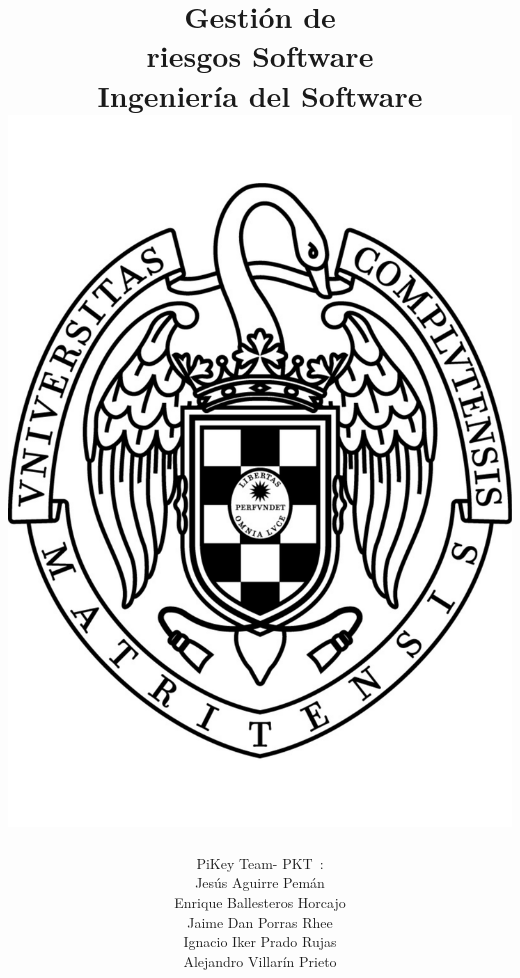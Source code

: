 \documentclass[spanish,a4paper,11pt, twoside]{report}	%
\newcommand*{\PKT}{\hbox{P}\kern-2.5pt\lower3.5pt\hbox{\small{K}}\kern-2.8pt\hbox{T}\kern-2pt}	%
\begin{document}
\title{\textbf{\huge{Gestión de \\ 
	riesgos Software}} \\ \vspace{0.3cm}
	\Large{Ingeniería del Software} \\
	\includegraphics[scale=0.3]{ucm.pdf}}
\author{{\Large{PiKey Team-}} \PKT \ : \vspace{0.2cm} \\
	Jesús Aguirre Pemán \\
	 Enrique Ballesteros Horcajo \\
	 Jaime Dan Porras Rhee \\
	 Ignacio Iker Prado Rujas \\
	 Alejandro Villarín Prieto }
\date{\Today}
\maketitle
\end{document}
